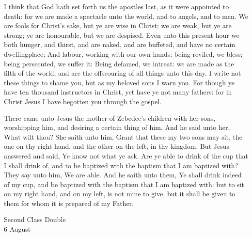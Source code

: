  I think that God hath set forth us the apostles last, as it were appointed to death: for we are made a spectacle unto the world, and to angels, and to men. We are fools for Christ's sake, but ye are wise in Christ; we are weak, but ye are strong; ye are honourable, but we are despised. Even unto this present hour we both hunger, and thirst, and are naked, and are buffeted, and have no certain dwellingplace; And labour, working with our own hands: being reviled, we bless; being persecuted, we suffer it: Being defamed, we intreat: we are made as the filth of the world, and are the offscouring of all things unto this day. I write not these things to shame you, but as my beloved sons I warn you. For though ye have ten thousand instructors in Christ, yet have ye not many fathers: for in Christ Jesus I have begotten you through the gospel.

 There came unto Jesus the mother of Zebedee's children with her sons, worshipping him, and desiring a certain thing of him. And he said unto her, What wilt thou? She saith unto him, Grant that these my two sons may sit, the one on thy right hand, and the other on the left, in thy kingdom. But Jesus answered and said, Ye know not what ye ask. Are ye able to drink of the cup that I shall drink of, and to be baptized with the baptism that I am baptized with? They say unto him, We are able. And he saith unto them, Ye shall drink indeed of my cup, and be baptized with the baptism that I am baptized with: but to sit on my right hand, and on my left, is not mine to give, but it shall be given to them for whom it is prepared of my Father.

\begin{inhead}
    {Second Class Double\\
6 August}
\end{inhead}

